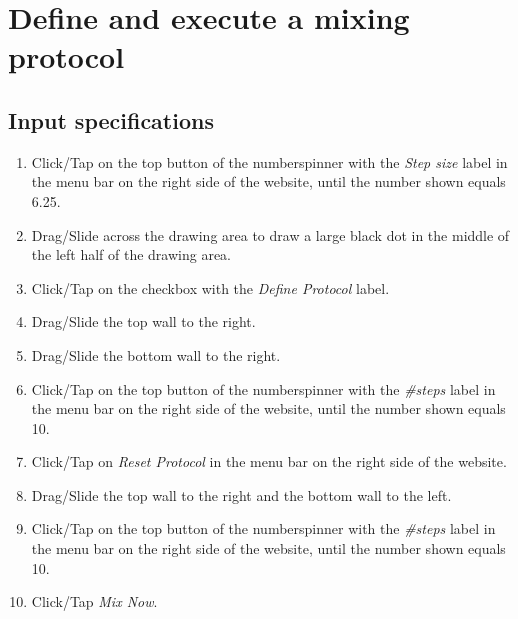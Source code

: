 \section{Define and execute a mixing protocol}

\subsection*{Input specifications}
\begin{enumerate}
\item Click/Tap on the top button of the numberspinner with the \emph{Step size} label in the menu bar on the right side of the website, until the number shown equals 6.25.
\item Drag/Slide across the drawing area to draw a large black dot in the middle of the left half of the drawing area.
\item Click/Tap on the checkbox with the \emph{Define Protocol} label.
\item Drag/Slide the top wall to the right.
\item Drag/Slide the bottom wall to the right.
\item Click/Tap on the top button of the numberspinner with the \emph{#steps} label in the menu bar on the right side of the website, until the number shown equals 10.
\item Click/Tap on \emph{Reset Protocol} in the menu bar on the right side of the website.
\item Drag/Slide the top wall to the right and the bottom wall to the left.
\item Click/Tap on the top button of the numberspinner with the \emph{#steps} label in the menu bar on the right side of the website, until the number shown equals 10.
\item Click/Tap \emph{Mix Now}.
\end{enumerate}

